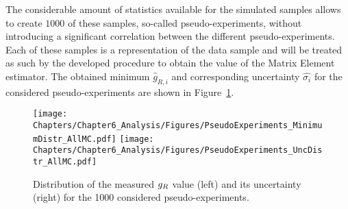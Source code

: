 The considerable amount of statistics available for the simulated samples allows to create $1 000$ of these samples, so-called pseudo-experiments, without introducing a significant correlation between the different pseudo-experiments.
Each of these samples is a representation of the data sample and will be treated as such by the developed procedure to obtain the value of the Matrix Element estimator.
The obtained minimum $\hat{g}_{R,i}$ and corresponding uncertainty $\hat{\sigma_i}$ for the considered pseudo-experiments are shown in Figure~\ref{fig::MinAndUnc}.
\\
\begin{figure}[h!t]
 \centering
 \texttt{[image: Chapters/Chapter6\_Analysis/Figures/PseudoExperiments\_MinimumDistr\_AllMC.pdf]} \hspace{0.5cm}
 \texttt{[image: Chapters/Chapter6\_Analysis/Figures/PseudoExperiments\_UncDistr\_AllMC.pdf]}
 \caption{Distribution of the measured $g_{R}$ value (left) and its uncertainty (right) for the 1000 considered pseudo-experiments.}  \label{fig::MinAndUnc}
\end{figure}

